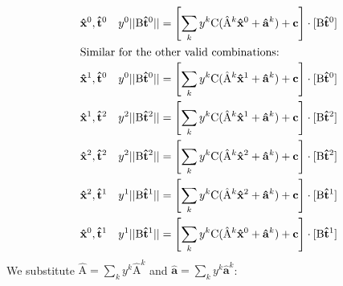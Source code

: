 \documentclass{scrartcl}
\begin{document}
\begin{subequations}
  \begin{align}
    \mathbf{\hat x}^0,\mathbf{\hat t}^0&&
    y^0||\mathrm B\mathbf{\hat t}^0||
    &=\left[\sum_ky^k\mathrm C(\mathrm{\hat A}^k\mathbf{\hat x}^0
              +\mathbf{\hat a}^k)+\mathbf c\right]
      \cdot[\mathrm B\mathbf{\hat t}^0]\\
  \intertext{Similar for the other valid combinations:}
  \mathbf{\hat x}^1,\mathbf{\hat t}^0&&
    y^0||\mathrm B\mathbf{\hat t}^0||
    &=\left[\sum_ky^k\mathrm C(\mathrm{\hat A}^k\mathbf{\hat x}^1
              +\mathbf{\hat a}^k)+\mathbf c\right]
      \cdot[\mathrm B\mathbf{\hat t}^0]\\
  \mathbf{\hat x}^1,\mathbf{\hat t}^2&&
    y^2||\mathrm B\mathbf{\hat t}^2||
    &=\left[\sum_ky^k\mathrm C(\mathrm{\hat A}^k\mathbf{\hat x}^1
              +\mathbf{\hat a}^k)+\mathbf c\right]
      \cdot[\mathrm B\mathbf{\hat t}^2]\\
  \mathbf{\hat x}^2,\mathbf{\hat t}^2&&
    y^2||\mathrm B\mathbf{\hat t}^2||
    &=\left[\sum_ky^k\mathrm C(\mathrm{\hat A}^k\mathbf{\hat x}^2
              +\mathbf{\hat a}^k)+\mathbf c\right]
      \cdot[\mathrm B\mathbf{\hat t}^2]\\
  \mathbf{\hat x}^2,\mathbf{\hat t}^1&&
    y^1||\mathrm B\mathbf{\hat t}^1||
    &=\left[\sum_ky^k\mathrm C(\mathrm{\hat A}^k\mathbf{\hat x}^2
              +\mathbf{\hat a}^k)+\mathbf c\right]
      \cdot[\mathrm B\mathbf{\hat t}^1]\\
  \mathbf{\hat x}^0,\mathbf{\hat t}^1&&
    y^1||\mathrm B\mathbf{\hat t}^1||
    &=\left[\sum_ky^k\mathrm C(\mathrm{\hat A}^k\mathbf{\hat x}^0
              +\mathbf{\hat a}^k)+\mathbf c\right]
      \cdot[\mathrm B\mathbf{\hat t}^1]
  \end{align}
\end{subequations}
We substitute $\mathrm{\hat A}=\sum_ky^k\mathrm{\hat A}^k$ and $\mathbf{\hat a}=\sum_ky^k\mathbf{\hat a}^k$:
\end{document}
